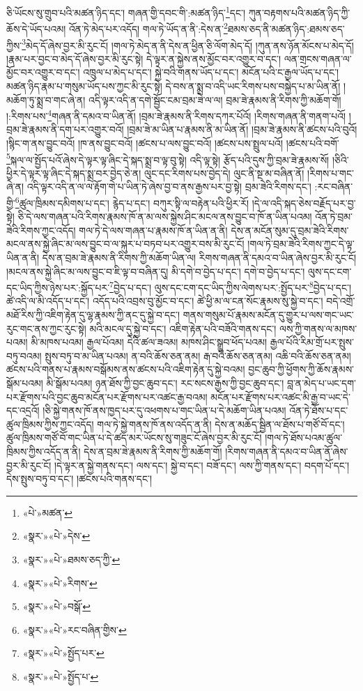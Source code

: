 ཅི་ཡོངས་སུ་གྲུབ་པའི་མཚན་ཉིད་དང་། གཞན་གྱི་དབང་གི་:མཚན་ཉིད་\footnote{«པེ་»མཚན་}དང་། ཀུན་བརྟགས་པའི་མཚན་ཉིད་ཀྱི་ཆོས་དེ་ཡོད་པའམ། འོན་ཏེ་མེད་པར་འདོད། གལ་ཏེ་ཡོད་ན་ནི་:དེས་ན་\footnote{«སྣར་»«པེ་»དེས་}ཐམས་ཅད་ནི་མཚན་ཉིད་:ཐམས་ཅད་ཀྱིས་\footnote{«སྣར་»«པེ་»ཐམས་ཅད་ཀྱི་}མེད་དོ་ཞེས་བྱར་མི་རུང་ངོ། །གལ་ཏེ་མེད་ན་ནི་དེས་ན་ཕྱིན་ཅི་ལོག་མེད་དོ། །ཀུན་ནས་ཉོན་མོངས་པ་མེད་དོ། །རྣམ་པར་བྱང་བ་མེད་དོ་ཞེས་བྱར་མི་རུང་སྟེ། དེ་ལྟར་ན་སྐྱེས་ནས་མྱོང་བར་འགྱུར་བ་དང་། ལན་གྲངས་གཞན་ལ་མྱོང་བར་འགྱུར་བ་དང་། འཁྲུལ་པ་མེད་པ་དང་། སྐྱེ་བའི་གནས་ཡོད་པ་དང་། མངོན་པའི་ང་རྒྱལ་ཡོད་པ་དང་། མཚན་ཉིད་རྣམ་པ་གསུམ་ཡོད་པས་ཀྱང་མི་རུང་སྟེ། དེ་བས་ན་སྨྲ་བ་འདི་ཡང་རིགས་པས་བསྐྱེད་པ་མ་ཡིན་ནོ། །མཆོག་ཏུ་སྨྲ་བ་གང་ཞེ་ན། འདི་ལྟར་འདི་ན་དགེ་སྦྱོང་ངམ་བྲམ་ཟེ་ལ་ལ། བྲམ་ཟེ་རྣམས་ནི་རིགས་ཀྱི་མཆོག་གོ། །:རིགས་པས་\footnote{«སྣར་»«པེ་»རིགས་}གཞན་ནི་དམའ་བ་ཡིན་ནོ། །བྲམ་ཟེ་རྣམས་ནི་རིགས་དཀར་པོའོ། །རིགས་གཞན་ནི་གནག་པའོ། །བྲམ་ཟེ་རྣམས་ནི་དག་པར་འགྱུར་བའོ། །བྲམ་ཟེ་མ་ཡིན་པ་རྣམས་ནི་མ་ཡིན་ནོ། །བྲམ་ཟེ་རྣམས་ནི་ཚངས་པའི་བུའོ། །སྙིང་ག་ནས་བྱུང་བའོ། །ཁ་ནས་བྱུང་བའོ། །ཚངས་པ་ལས་བྱུང་བའོ། །ཚངས་པས་སྤྲུལ་པའོ། །ཚངས་པའི་བགོ་\footnote{«སྣར་»«པེ་»བསྒོ་}སྐལ་ལ་སྤྱོད་པའོ་ཞེས་དེ་ལྟར་ལྟ་ཞིང་དེ་སྐད་སྨྲ་བ་ལྟ་བུ་སྟེ། འདི་ལྟ་སྟེ། རྩོད་པའི་དུས་ཀྱི་བྲམ་ཟེ་རྣམས་སོ། །ཅིའི་ཕྱིར་དེ་ལྟར་ལྟ་ཞིང་དེ་སྐད་སྨྲ་བར་བྱེད་ཅེ་ན། ལུང་དང་རིགས་པས་བྱེད་དེ། ལུང་ནི་སྔ་མ་བཞིན་ནོ། །རིགས་པ་གང་ཞེ་ན། འདི་ལྟར་འདི་ན་ལ་ལ་རྟོག་གེ་པ་ཡིན་ཏེ་ཞེས་བྱ་བ་ནས་རྒྱས་པར་བྱ་སྟེ། བྲམ་ཟེའི་རིགས་དང་། :རང་བཞིན་གྱི་\footnote{«སྣར་»«པེ་»རང་བཞིན་གྱིས་}ཚུལ་ཁྲིམས་དམིགས་པ་དང་། རྙེད་པ་དང་། བཀུར་སྟི་ལ་བརྟེན་པའི་ཕྱིར་རོ། །དེ་ལ་འདི་སྐད་ཅེས་བརྗོད་པར་བྱ་སྟེ། ཅི་དེ་ལས་གཞན་པའི་རིགས་རྣམས་ཁོ་ན་མ་ལས་སྐྱེས་ཤིང་མངལ་ནས་བྱུང་བ་ཁོ་ན་ཡིན་པའམ། འོན་ཏེ་བྲམ་ཟེའི་རིགས་ཀྱང་འདོད། གལ་ཏེ་དེ་ལས་གཞན་པ་རྣམས་ཁོ་ན་ཡིན་ན་ནི། དེས་ན་མངོན་སུམ་དུ་བྲམ་ཟེའི་རིགས་མངལ་ནས་སྐྱེ་ཞིང་མ་ལས་བྱུང་བ་ལ་སྐུར་པ་བཏབ་པར་འགྱུར་བས་མི་རུང་ངོ། །གལ་ཏེ་བྲམ་ཟེའི་རིགས་ཀྱང་དེ་ལྟ་ཡིན་ན་ནི། དེས་ན་བྲམ་ཟེ་རྣམས་ནི་རིགས་ཀྱི་མཆོག་ཡིན་ལ། རིགས་གཞན་ནི་དམའ་བ་ཡིན་ཞེས་བྱར་མི་རུང་ངོ། །མངལ་ནས་སྐྱེ་ཞིང་མ་ལས་བྱུང་བ་ཇི་ལྟ་བ་བཞིན་དུ། མི་དགེ་བ་བྱེད་པ་དང་། དགེ་བ་བྱེད་པ་དང་། ལུས་དང་ངག་དང་ཡིད་ཀྱིས་ཉེས་པར་:སྐྱོད་པར་\footnote{«སྣར་»«པེ་»སྤྱོད་པར་}བྱེད་པ་དང་། ལུས་དང་ངག་དང་ཡིད་ཀྱིས་ལེགས་པར་:སྤྱོད་པར་\footnote{«སྣར་»«པེ་»སྤྱོད་པ་}བྱེད་པ་དང་། ཚེ་འདི་ལ་མི་འདོད་པ་དང་། འདོད་པའི་འབྲས་བུ་མྱོང་བ་དང་། ཚེ་ཕྱི་མ་ལ་ངན་སོང་རྣམས་སུ་སྐྱེ་བ་དང་། བདེ་འགྲོ་མཐོ་རིས་ཀྱི་འཇིག་རྟེན་དུ་ལྷ་རྣམས་ཀྱི་ནང་དུ་སྐྱེ་བ་དང་། གནས་གསུམ་པོ་རྣམས་མངོན་དུ་གྱུར་པ་ལས་གང་ཡང་རུང་གང་ནས་ཀྱང་རུང་སྟེ། མའི་མངལ་དུ་སྐྱེ་བ་དང་། འཇིག་རྟེན་པའི་བཟོའི་གནས་དང་། ལས་ཀྱི་གནས་ལ་མཁས་པའམ། མི་མཁས་པའམ། རྒྱལ་པོའམ། དེའི་ཚལ་ཟའམ། མཁས་ཤིང་སྒྲུབ་ཕོད་པའམ། རྒྱལ་པོའི་རིམ་གྲོ་པར་སྤུས་བཏུ་བའམ། སྤུས་བཏུ་བ་མ་ཡིན་པའམ། ན་བའི་ཆོས་ཅན་ནམ། རྒ་བའི་ཆོས་ཅན་ནམ། འཆི་བའི་ཆོས་ཅན་ནམ། ཚངས་པའི་གནས་པ་རྣམས་བསྒོམས་ནས་ཚངས་པའི་འཇིག་རྟེན་དུ་སྐྱེ་བའམ། བྱང་ཆུབ་ཀྱི་ཕྱོགས་ཀྱི་ཆོས་རྣམས་སྒོམ་པའམ། མི་སྒོམ་པའམ། ཉན་ཐོས་ཀྱི་བྱང་ཆུབ་དང་། རང་སངས་རྒྱས་ཀྱི་བྱང་ཆུབ་དང་། བླ་ན་མེད་པ་ཡང་དག་པར་རྫོགས་པའི་བྱང་ཆུབ་མངོན་པར་རྫོགས་པར་འཚང་རྒྱ་བའམ། མངོན་པར་རྫོགས་པར་འཚང་མི་རྒྱ་བ་ཡང་དེ་དང་འདྲའོ། །ཅི་སྐྱེ་གནས་ཁོ་ནས་ཁྱད་པར་དུ་འཕགས་པ་གང་ཡིན་པ་དེ་མཆོག་ཡིན་པའམ། འོན་ཏེ་ཐོས་པ་དང་ཚུལ་ཁྲིམས་ཀྱིས་ཀྱང་འདོད། གལ་ཏེ་སྐྱེ་གནས་ཁོ་ནས་འདོད་ན་ནི། དེས་ན་མཆོད་སྦྱིན་ལ་ཐོས་པ་གཙོ་བོ་དང་། ཚུལ་ཁྲིམས་གཙོ་བོ་གང་ཡིན་པ་དེ་ཚད་མར་ཡོངས་སུ་གཟུང་ངོ་ཞེས་བྱར་མི་རུང་ངོ། །གལ་ཏེ་ཐོས་པའམ་ཚུལ་ཁྲིམས་ཀྱིས་འདོད་ན་ནི། དེས་ན་བྲམ་ཟེ་རྣམས་ནི་རིགས་ཀྱི་མཆོག་གོ། །རིགས་གཞན་ནི་དམའ་བ་ཡིན་ནོ་ཞེས་བྱར་མི་རུང་ངོ། །དེ་ལྟར་ན་སྐྱེ་གནས་དང་། ལས་དང་། སྐྱེ་བ་དང་། བཟོ་དང་། ལས་ཀྱི་གནས་དང་། བདག་པོ་དང་། དེས་སྤུས་བཏུ་བ་དང་། །ཚངས་པའི་གནས་དང་། 